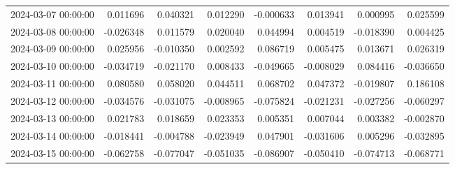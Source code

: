 \begin{tabular}{lrrrrrrr}
2024-03-07 00:00:00 & 0.011696 & 0.040321 & 0.012290 & -0.000633 & 0.013941 & 0.000995 & 0.025599 \\
2024-03-08 00:00:00 & -0.026348 & 0.011579 & 0.020040 & 0.044994 & 0.004519 & -0.018390 & 0.004425 \\
2024-03-09 00:00:00 & 0.025956 & -0.010350 & 0.002592 & 0.086719 & 0.005475 & 0.013671 & 0.026319 \\
2024-03-10 00:00:00 & -0.034719 & -0.021170 & 0.008433 & -0.049665 & -0.008029 & 0.084416 & -0.036650 \\
2024-03-11 00:00:00 & 0.080580 & 0.058020 & 0.044511 & 0.068702 & 0.047372 & -0.019807 & 0.186108 \\
2024-03-12 00:00:00 & -0.034576 & -0.031075 & -0.008965 & -0.075824 & -0.021231 & -0.027256 & -0.060297 \\
2024-03-13 00:00:00 & 0.021783 & 0.018659 & 0.023353 & 0.005351 & 0.007044 & 0.003382 & -0.002870 \\
2024-03-14 00:00:00 & -0.018441 & -0.004788 & -0.023949 & 0.047901 & -0.031606 & 0.005296 & -0.032895 \\
2024-03-15 00:00:00 & -0.062758 & -0.077047 & -0.051035 & -0.086907 & -0.050410 & -0.074713 & -0.068771 \\
\bottomrule
\end{tabular}
